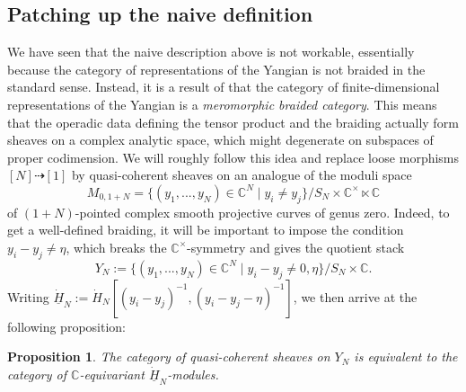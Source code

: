 \documentclass[11pt]{report}
\newtheorem{prop}[theorem]{Proposition}
\theoremstyle{definition}
\theoremstyle{remark}
\theoremstyle{remark}
\newcommand{\C}{\mathbb{C}}
\begin{document}
\subsection{Patching up the naive definition}\label{subsection:patch}

We have seen that the naive description above is not workable, essentially because the category of representations of the Yangian is not braided in the standard sense. Instead, it is a result of \cite{article:soibelman:1997} that the category of finite-dimensional representations of the Yangian is a \emph{meromorphic braided category}. This means that the operadic data defining the tensor product and the braiding actually form sheaves on a complex analytic space, which might degenerate on subspaces of proper codimension. We will roughly follow this idea and replace loose morphisms $[N] \dashrightarrow [1]$ by quasi-coherent sheaves on an analogue of the moduli space
\begin{equation*}
M_{0,1+N} = \{ (y_1,...,y_N) \in \C^N \mid y_i \neq y_j \} / S_N \times \C^\times \ltimes \C
\end{equation*}
of $(1+N)$-pointed complex smooth projective curves of genus zero. Indeed, to get a well-defined braiding, it will be important to impose the condition $y_i-y_j \neq \eta$, which breaks the $\C^\times$-symmetry and gives the quotient stack
\begin{equation*}
Y_N := \{ (y_1,...,y_N) \in \C^N \mid y_i-y_j \neq 0,\eta \}/S_N \times \C.
\end{equation*}
Writing $\underline{\dot H}_N := \dot H_N[(y_i-y_j)^{-1},(y_i-y_j-\eta)^{-1}]$, we then arrive at the following proposition:

\begin{prop}
The category of quasi-coherent sheaves on $Y_N$ is equivalent to the category of $\C$-equivariant $\underline{\dot H}_N$-modules.
\end{prop}
\end{document}
